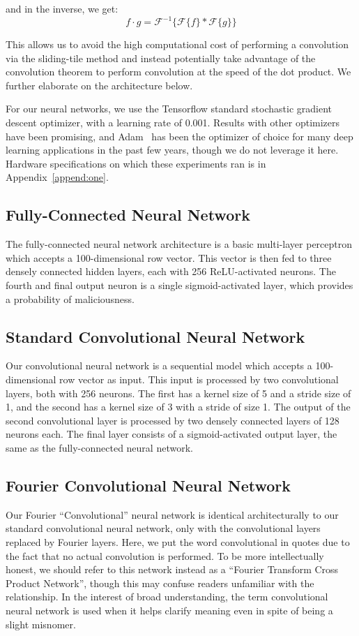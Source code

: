 and in the inverse, we get:
$$f \cdot g = \mathcal{F}^{-1}\{\mathcal{F}\{f\} * \mathcal{F}\{g\}\}$$

This allows us to avoid the high computational cost of performing a convolution via the sliding-tile method and instead potentially take advantage of the convolution theorem to perform convolution at the speed of the dot product.
We further elaborate on the architecture below.

For our neural networks, we use the Tensorflow standard stochastic gradient descent optimizer, with a learning rate of 0.001.
Results with other optimizers have been promising, and Adam~\cite{kingma2014adam} has been the optimizer of choice for many deep learning applications in the past few years, though we do not leverage it here. 
Hardware specifications on which these experiments ran is in Appendix~\ref{append:one}.

\subsection{Fully-Connected Neural Network}
The fully-connected neural network architecture is a basic multi-layer perceptron which accepts a 100-dimensional row vector.
This vector is then fed to three densely connected hidden layers, each with 256 ReLU-activated neurons.
The fourth and final output neuron is a single sigmoid-activated layer, which provides a probability of maliciousness.

\subsection{Standard Convolutional Neural Network}
Our convolutional neural network is a sequential model which accepts a 100-dimensional row vector as input.
This input is processed by two convolutional layers, both with 256 neurons.
The first has a kernel size of 5 and a stride size of 1, and the second has a kernel size of 3 with a stride of size 1.
The output of the second convolutional layer is processed by two densely connected layers of 128 neurons each. 
The final layer consists of a sigmoid-activated output layer, the same as the fully-connected neural network.

\subsection{Fourier Convolutional Neural Network}
Our Fourier ``Convolutional'' neural network is identical architecturally to our standard convolutional neural network, only with the convolutional layers replaced by Fourier layers.
Here, we put the word convolutional in quotes due to the fact that no actual convolution is performed.
To be more intellectually honest, we should refer to this network instead as a ``Fourier Transform Cross Product Network'', though this may confuse readers unfamiliar with the relationship.
In the interest of broad understanding, the term convolutional neural network is used when it helps clarify meaning even in spite of being a slight misnomer.

